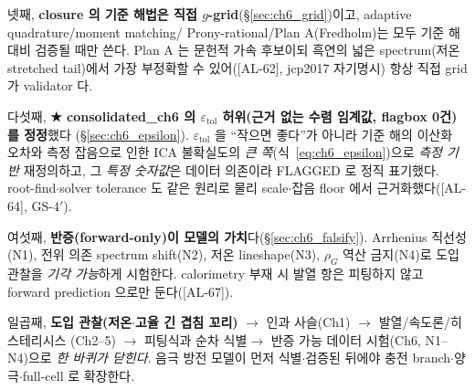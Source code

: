 \documentclass[11pt,a4paper]{article}
\newcommand{\tol}{\mathrm{tol}}
\newcommand{\AL}[1]{\textsf{[AL-#1]}}
\begin{document}
넷째, \textbf{closure 의 기준 해법은 직접 $g$-grid}(\S\ref{sec:ch6_grid})이고, adaptive quadrature/moment matching/
Prony-rational/Plan A(Fredholm)는 모두 기준 해 대비 검증될 때만 쓴다. Plan A 는 문헌적 가속 후보이되 흑연의 넓은
spectrum(저온 stretched tail)에서 가장 부정확할 수 있어(\AL{62}, jcp2017 자기명시) 항상 직접 grid 가 validator 다.

다섯째, \textbf{★ consolidated\_ch6 의 $\varepsilon_\tol$ 허위(근거 없는 수렴 임계값, flagbox 0건)를 정정}했다
(\S\ref{sec:ch6_epsilon}). $\varepsilon_\tol$ 을 ``작으면 좋다''가 아니라 기준 해의 이산화 오차와 측정 잡음으로
인한 ICA 불확실도의 \emph{큰 쪽}(식~\eqref{eq:ch6_epsilon})으로 \emph{측정 기반} 재정의하고, 그 \emph{특정 숫자값}은
데이터 의존이라 FLAGGED 로 정직 표기했다. root-find$\cdot$solver tolerance 도 같은 원리로 물리 scale$\cdot$잡음
floor 에서 근거화했다(\AL{64}, GS-4$'$).

여섯째, \textbf{반증(forward-only)이 모델의 가치}다(\S\ref{sec:ch6_falsify}). Arrhenius 직선성(N1), 전위 의존
spectrum shift(N2), 저온 lineshape(N3), $\rho_G$ 역산 금지(N4)로 도입 관찰을 \emph{기각 가능}하게 시험한다.
calorimetry 부재 시 발열 항은 피팅하지 않고 forward prediction 으로만 둔다(\AL{67}).

일곱째, \textbf{도입 관찰(저온$\cdot$고율 긴 겹침 꼬리)} $\to$ 인과 사슬(Ch1) $\to$ 발열/속도론/히스테리시스
(Ch2--5) $\to$ 피팅식과 순차 식별$\to$ 반증 가능 데이터 시험(Ch6, N1--N4)으로 \emph{한 바퀴가 닫힌다}. 음극
방전 모델이 먼저 식별$\cdot$검증된 뒤에야 충전 branch$\cdot$양극$\cdot$full-cell 로 확장한다.
\end{document}
